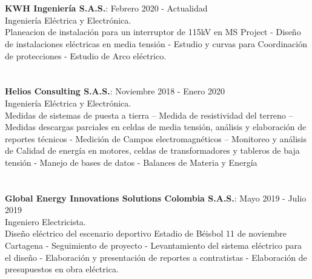 \documentclass[margin]{res}
\begin{document}
\begin{resume}
\section{\centering}
\textbf{KWH Ingeniería S.A.S.}: \hfill Febrero 2020 - Actualidad
\\Ingeniería Eléctrica y Electrónica.
\\Planeacion de instalación para un interruptor de 115kV en MS Project - Diseño de instalaciones eléctricas en media tensión - Estudio y curvas para Coordinación de protecciones - Estudio de Arco eléctrico. 

\section{\centering}
\textbf{Helios Consulting S.A.S.}: \hfill Noviembre 2018 - Enero 2020
\\Ingeniería Eléctrica y Electrónica.
\\Medidas de sistemas de puesta a tierra – Medida de resistividad del terreno – Medidas descargas parciales en celdas de media tensión, análisis y elaboración de reportes técnicos - Medición de Campos electromagnéticos – Monitoreo y análisis de Calidad de energía en motores, celdas de transformadores y tableros de baja tensión - Manejo de bases de datos - Balances de Materia y Energía 

\section{\centering}
\par
\textbf{Global Energy Innovations Solutions Colombia S.A.S.}: \hfill Mayo 2019 - Julio 2019
\\ Ingeniero Electricista.
\\Diseño eléctrico del escenario deportivo Estadio de Béisbol 11 de noviembre Cartagena - Seguimiento de proyecto - Levantamiento del sistema eléctrico para el diseño - Elaboración y presentación de reportes a contratistas - Elaboración de presupuestos en obra eléctrica.


\end{resume}
\end{document}
